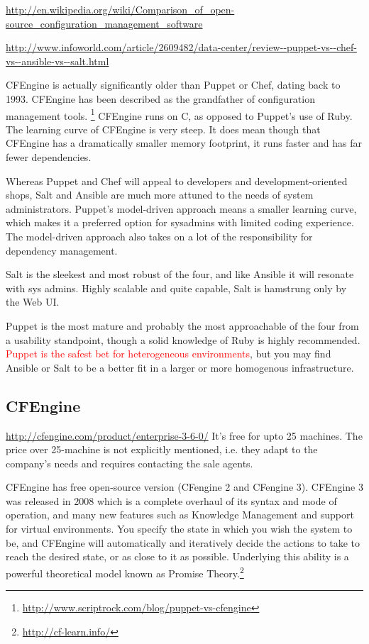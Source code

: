 \url{http://en.wikipedia.org/wiki/Comparison_of_open-source_configuration_management_software}

\url{http://www.infoworld.com/article/2609482/data-center/review--puppet-vs--chef-vs--ansible-vs--salt.html}

CFEngine is actually significantly older than Puppet or Chef, dating back to
1993. CFEngine has been described as the grandfather of configuration management
tools. \footnote{\url{http://www.scriptrock.com/blog/puppet-vs-cfengine}}
CFEngine runs on C, as opposed to Puppet's use of Ruby.
The learning curve of CFEngine is very steep. It does mean though that CFEngine
has a dramatically smaller memory footprint, it runs faster and has far fewer
dependencies. 

Whereas Puppet and Chef will appeal to developers and development-oriented
shops, Salt and Ansible are much more attuned to the needs of system
administrators. Puppet's model-driven approach means a smaller learning curve,
which makes it a preferred option for sysadmins with limited coding experience.
The model-driven approach also takes on a lot of the responsibility for
dependency management.

Salt is the sleekest and most robust of the four, and like Ansible it will
resonate with sys admins. Highly scalable and quite capable, Salt is hamstrung
only by the Web UI. 


Puppet is the most mature and probably the most approachable of the four from a
usability standpoint, though a solid knowledge of Ruby is highly recommended.
\textcolor{red}{Puppet is the safest bet for heterogeneous environments}, but 
you may find Ansible or Salt to be a better fit in a larger or more homogenous
infrastructure. 

\subsection{CFEngine}

\url{http://cfengine.com/product/enterprise-3-6-0/}
It's free for upto 25 machines. The price over 25-machine is not explicitly
mentioned, i.e. they adapt to the company's needs and requires contacting the
sale agents.

CFEngine has free open-source version (CFengine 2 and CFengine 3). CFEngine 3
was released in 2008 which is a  complete overhaul of its syntax and mode of
operation, and many new features such as Knowledge Management and support for
virtual environments. You specify the state in which you wish the system to be,
and CFEngine will automatically and iteratively decide the actions to take to
reach the desired state, or as close to it as possible. Underlying this ability
is a powerful theoretical model known as Promise
Theory.\footnote{\url{http://cf-learn.info/}}

